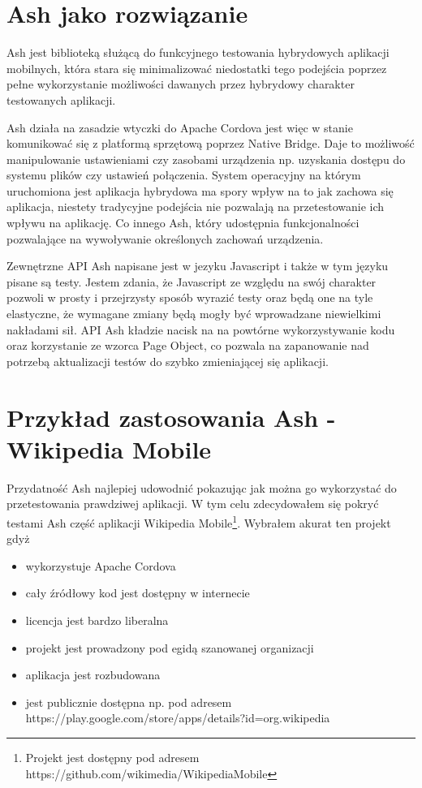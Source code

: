 \documentclass[brudnopis]{xmgr}
\begin{document}
                                                                                                                                                                 
\section{Ash jako rozwiązanie}

Ash jest biblioteką służącą do funkcyjnego testowania hybrydowych aplikacji mobilnych, która stara się minimalizować niedostatki tego podejścia poprzez pełne wykorzystanie możliwości dawanych przez hybrydowy charakter testowanych aplikacji. 

Ash działa na zasadzie wtyczki do Apache Cordova jest więc w stanie komunikować się z platformą sprzętową poprzez Native Bridge. Daje to możliwość manipulowanie ustawieniami czy zasobami urządzenia np. uzyskania dostępu do systemu plików czy ustawień połączenia. System operacyjny na którym uruchomiona jest aplikacja hybrydowa ma spory wpływ na to jak zachowa się aplikacja, niestety tradycyjne podejścia nie pozwalają na przetestowanie ich wpływu na aplikację. Co innego Ash, który udostępnia funkcjonalności pozwalające na wywoływanie określonych zachowań urządzenia. 

Zewnętrzne API Ash napisane jest w jezyku Javascript i także w tym języku pisane są testy. Jestem zdania, że Javascript ze względu na swój charakter pozwoli w prosty i przejrzysty sposób wyrazić testy oraz będą one na tyle elastyczne, że wymagane zmiany będą mogły być wprowadzane niewielkimi nakładami sił. API Ash kładzie nacisk na na powtórne wykorzystywanie kodu oraz korzystanie ze wzorca Page Object, co pozwala na zapanowanie nad potrzebą aktualizacji testów do szybko zmieniającej się aplikacji. 

\section{Przykład zastosowania Ash - Wikipedia Mobile}

Przydatność Ash najlepiej udowodnić pokazując jak można go wykorzystać do przetestowania prawdziwej aplikacji. W tym celu zdecydowałem się pokryć testami Ash część aplikacji Wikipedia Mobile\footnote{Projekt jest dostępny pod adresem https://github.com/wikimedia/WikipediaMobile}. Wybrałem akurat ten projekt gdyż

\begin{itemize}
  \item wykorzystuje Apache Cordova
  \item cały źródłowy kod jest dostępny w internecie
  \item licencja jest bardzo liberalna
  \item projekt jest prowadzony pod egidą szanowanej organizacji
  \item aplikacja jest rozbudowana
  \item jest publicznie dostępna np. pod adresem https://play.google.com/store/apps/details?id=org.wikipedia
\end{itemize}
\end{document}
